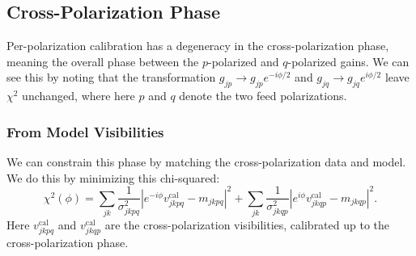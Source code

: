 \documentclass{article}
\begin{document}
\subsection{Cross-Polarization Phase}

Per-polarization calibration has a degeneracy in the cross-polarization phase, meaning the overall phase between the $p$-polarized and $q$-polarized gains. We can see this by noting that the transformation $g_{jp} \rightarrow g_{jp} e^{-i\phi/2}$ and $g_{jq} \rightarrow g_{jq} e^{i\phi/2}$ leave $\chi^2$ unchanged, where here $p$ and $q$ denote the two feed polarizations.

\subsubsection{From Model Visibilities}

We can constrain this phase by matching the cross-polarization data and model. We do this by minimizing this chi-squared:
\begin{equation}
\chi^2(\phi) = \sum_{jk} \frac{1}{\sigma^2_{jkpq}} \left| e^{-i\phi} v^\text{cal}_{jkpq} - m_{jkpq} \right|^2 + \sum_{jk} \frac{1}{\sigma^2_{jkqp}} \left| e^{i\phi} v^\text{cal}_{jkqp} - m_{jkqp} \right|^2.
\end{equation}
Here $v^\text{cal}_{jkpq}$ and $v^\text{cal}_{jkqp}$ are the cross-polarization visibilities, calibrated up to the cross-polarization phase.
\end{document}
